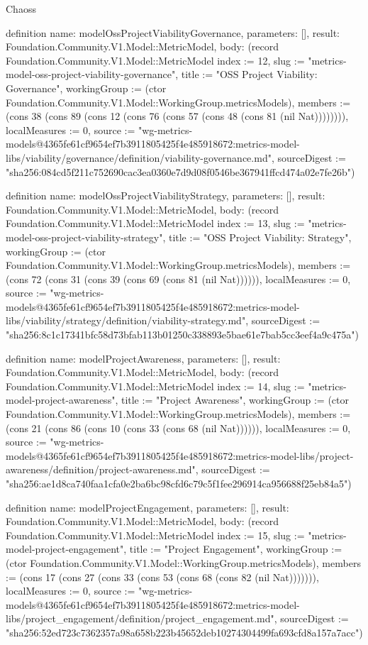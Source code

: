 \begin{lexlean}{Chaoss}
\begin{semanticmodule}
definition{
  name: modelOssProjectViabilityGovernance,
  parameters: [],
  result: Foundation.Community.V1.Model::MetricModel,
  body: (record Foundation.Community.V1.Model::MetricModel {index := 12, slug := "metrics-model-oss-project-viability-governance", title := "OSS Project Viability: Governance", workingGroup := (ctor Foundation.Community.V1.Model::WorkingGroup.metricsModels), members := (cons 38 (cons 89 (cons 12 (cons 76 (cons 57 (cons 48 (cons 81 (nil Nat)))))))), localMeasures := 0, source := "wg-metrics-models@4365fe61cf9654ef7b3911805425f4e485918672:metrics-model-libs/viability/governance/definition/viability-governance.md", sourceDigest := "sha256:084cd5f211c752690cac3ea0360e7d9d08f0546be367941ffcd474a02e7fe26b"})
}

definition{
  name: modelOssProjectViabilityStrategy,
  parameters: [],
  result: Foundation.Community.V1.Model::MetricModel,
  body: (record Foundation.Community.V1.Model::MetricModel {index := 13, slug := "metrics-model-oss-project-viability-strategy", title := "OSS Project Viability: Strategy", workingGroup := (ctor Foundation.Community.V1.Model::WorkingGroup.metricsModels), members := (cons 72 (cons 31 (cons 39 (cons 69 (cons 81 (nil Nat)))))), localMeasures := 0, source := "wg-metrics-models@4365fe61cf9654ef7b3911805425f4e485918672:metrics-model-libs/viability/strategy/definition/viability-strategy.md", sourceDigest := "sha256:8c1c17341bfc58d73bfab113b01250c338893e5bae61e7bab5cc3eef4a9c475a"})
}

definition{
  name: modelProjectAwareness,
  parameters: [],
  result: Foundation.Community.V1.Model::MetricModel,
  body: (record Foundation.Community.V1.Model::MetricModel {index := 14, slug := "metrics-model-project-awareness", title := "Project Awareness", workingGroup := (ctor Foundation.Community.V1.Model::WorkingGroup.metricsModels), members := (cons 21 (cons 86 (cons 10 (cons 33 (cons 68 (nil Nat)))))), localMeasures := 0, source := "wg-metrics-models@4365fe61cf9654ef7b3911805425f4e485918672:metrics-model-libs/project-awareness/definition/project-awareness.md", sourceDigest := "sha256:ae1d8ca740faa1cfa0e2ba6bc98cfd6c79c5f1fee296914ca956688f25eb84a5"})
}

definition{
  name: modelProjectEngagement,
  parameters: [],
  result: Foundation.Community.V1.Model::MetricModel,
  body: (record Foundation.Community.V1.Model::MetricModel {index := 15, slug := "metrics-model-project-engagement", title := "Project Engagement", workingGroup := (ctor Foundation.Community.V1.Model::WorkingGroup.metricsModels), members := (cons 17 (cons 27 (cons 33 (cons 53 (cons 68 (cons 82 (nil Nat))))))), localMeasures := 0, source := "wg-metrics-models@4365fe61cf9654ef7b3911805425f4e485918672:metrics-model-libs/project_engagement/definition/project_engagement.md", sourceDigest := "sha256:52ed723c7362357a98a658b223b45652deb10274304499fa693cfd8a157a7acc"})
}


\end{semanticmodule}
\end{lexlean}
